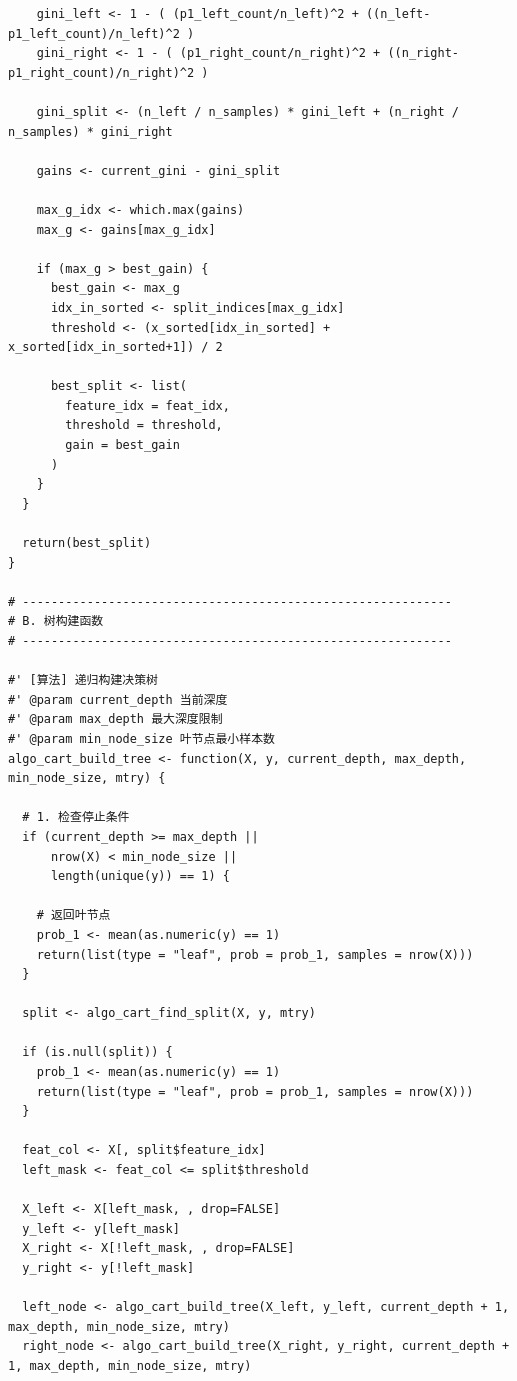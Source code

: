 \documentclass[11pt, a4paper]{article}
\begin{document}
\begin{verbatim}
    gini_left <- 1 - ( (p1_left_count/n_left)^2 + ((n_left-p1_left_count)/n_left)^2 )
    gini_right <- 1 - ( (p1_right_count/n_right)^2 + ((n_right-p1_right_count)/n_right)^2 )
    
    gini_split <- (n_left / n_samples) * gini_left + (n_right / n_samples) * gini_right
    
    gains <- current_gini - gini_split
    
    max_g_idx <- which.max(gains)
    max_g <- gains[max_g_idx]
    
    if (max_g > best_gain) {
      best_gain <- max_g
      idx_in_sorted <- split_indices[max_g_idx]
      threshold <- (x_sorted[idx_in_sorted] + x_sorted[idx_in_sorted+1]) / 2
      
      best_split <- list(
        feature_idx = feat_idx,
        threshold = threshold,
        gain = best_gain
      )
    }
  }
  
  return(best_split)
}

# ------------------------------------------------------------
# B. 树构建函数
# ------------------------------------------------------------

#' [算法] 递归构建决策树
#' @param current_depth 当前深度
#' @param max_depth 最大深度限制
#' @param min_node_size 叶节点最小样本数
algo_cart_build_tree <- function(X, y, current_depth, max_depth, min_node_size, mtry) {
  
  # 1. 检查停止条件
  if (current_depth >= max_depth || 
      nrow(X) < min_node_size || 
      length(unique(y)) == 1) {
    
    # 返回叶节点
    prob_1 <- mean(as.numeric(y) == 1)
    return(list(type = "leaf", prob = prob_1, samples = nrow(X)))
  }
  
  split <- algo_cart_find_split(X, y, mtry)
  
  if (is.null(split)) {
    prob_1 <- mean(as.numeric(y) == 1)
    return(list(type = "leaf", prob = prob_1, samples = nrow(X)))
  }

  feat_col <- X[, split$feature_idx]
  left_mask <- feat_col <= split$threshold
  
  X_left <- X[left_mask, , drop=FALSE]
  y_left <- y[left_mask]
  X_right <- X[!left_mask, , drop=FALSE]
  y_right <- y[!left_mask]

  left_node <- algo_cart_build_tree(X_left, y_left, current_depth + 1, max_depth, min_node_size, mtry)
  right_node <- algo_cart_build_tree(X_right, y_right, current_depth + 1, max_depth, min_node_size, mtry)
  

\end{verbatim}
\end{document}

